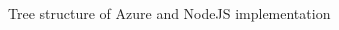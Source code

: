 \documentclass[a4paper,twoside,11pt, pagesize]{scrartcl}
\begin{document}
\begin{spacing}{1.2}
\begin{figure}[H]
\caption{Tree structure of Azure and NodeJS implementation}
\end{figure} 








\end{spacing}
\end{document}
